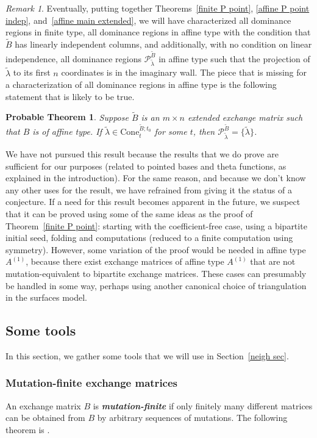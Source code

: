 \documentclass[10pt]{article}
\newtheorem{probable}[proposition]{Probable Theorem}
\theoremstyle{definition}
\theoremstyle{remark}
\newtheorem{remark}[proposition]{Remark}
\numberwithin{equation}{section}
\newcommand{\newword}[1]{\textbf{\emph{#1}}}
\newcommand{\set}[1]{{\lbrace #1 \rbrace}}
\newcommand{\0}{{\mathbf{0}}}
\newcommand{\Cone}{\mathrm{Cone}}
\newcommand{\tB}{{\widetilde{B}}}
\renewcommand{\P}{\mathcal{P}}
\newcommand{\afftype}[1]{{#1^{(1)}}}
\begin{document}
\begin{remark}\label{affine P point remark}
  Eventually, putting together Theorems~\ref{finite P point}, \ref{affine P point indep}, and~\ref{affine main extended}, we will have characterized all dominance regions in finite type, all dominance regions in affine type with the condition that $\tB$ has linearly independent columns, and additionally, with no condition on linear independence, all dominance regions $\P_{\tilde\lambda}^\tB$ in affine type such that the projection of $\tilde\lambda$ to its first $n$ coordinates is in the imaginary wall.
The piece that is missing for a characterization of all dominance regions in affine type is the following statement that is likely to be true.

\begin{probable}\label{affine P point} 
Suppose $\tB$ is an $m\times n$ extended exchange matrix such that $B$ is of affine type.
  If $\tilde\lambda\in\Cone^{\tB;t_0}_t$ for some $t$, then $\P^\tB_{\tilde\lambda}=\set{\tilde\lambda}$.
\end{probable}

We have not pursued this result because the results that we do prove are sufficient for our purposes (related to pointed bases and theta functions, as explained in the introduction).
For the same reason, and because we don't know any other uses for the result, we have refrained from giving it the status of a conjecture. 
If a need for this result becomes apparent in the future, we suspect that it can be proved using some of the same ideas as the proof of Theorem~\ref{finite P point}:
starting with the coefficient-free case, using a bipartite initial seed, folding and computations (reduced to a finite computation using symmetry).
However, some variation of the proof would be needed in affine type $\afftype A$, because there exist exchange matrices of affine type $\afftype A$ that are not mutation-equivalent to bipartite exchange matrices.
These cases can presumably be handled in some way, perhaps using another canonical choice of triangulation in the surfaces model.
\end{remark}


\subsection{Some tools}
In this section, we gather some tools that we will use in Section~\ref{neigh sec}.

\subsubsection{Mutation-finite exchange matrices}\label{mut fin sec}
An exchange matrix $B$ is \newword{mutation-finite} if only finitely many different matrices can be obtained from $B$ by arbitrary sequences of mutations.
The following theorem is \cite[Theorem~2.8]{FeShTu}.  
\end{document}
